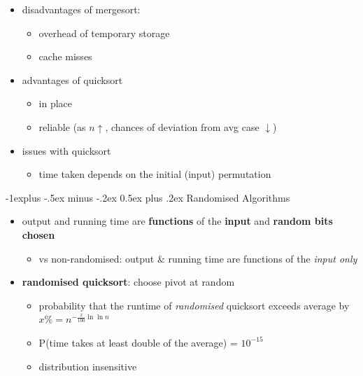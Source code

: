 \documentclass[10pt, landscape]{article}
\makeatletter
\renewcommand{\subsection}{\@startsection{subsection}{2}{0mm}%
  {-1explus -.5ex minus -.2ex}%
  {0.5ex plus .2ex}%
{\normalfont\normalsize\bfseries}}
\makeatother
\begin{document}
\begin{multicols*}{4}
  \begin{itemize}
    \item disadvantages of mergesort:
      \begin{itemize}
        \item overhead of temporary storage
        \item cache misses
      \end{itemize}
    \item advantages of quicksort
      \begin{itemize}
        \item in place
        \item reliable (as $n \uparrow$, chances of deviation from avg case $\downarrow$)
      \end{itemize}
    \item issues with quicksort
      \begin{itemize}
        \item {} time taken depends on the initial (input) permutation
      \end{itemize}
  \end{itemize}

  \subsection{Randomised Algorithms}

  \begin{itemize}
    \item {} output and running time are \textbf{functions} of the \textbf{input} and \textbf{random bits chosen}
      \begin{itemize}
        \item vs non-randomised: output \& running time are functions of the \textit{input only}
      \end{itemize}
    \item \textbf{randomised quicksort}: choose pivot at random 
      \begin{itemize}
        \item probability that the runtime of \textit{randomised} quicksort exceeds average by $x\% = n^{-\frac{x}{100}\ln\ln n}$ 
        \item P(time takes at least double of the average) = $10^{-15}$
        \item distribution insensitive
      \end{itemize}
  \end{itemize}


\end{multicols*}
\end{document}
